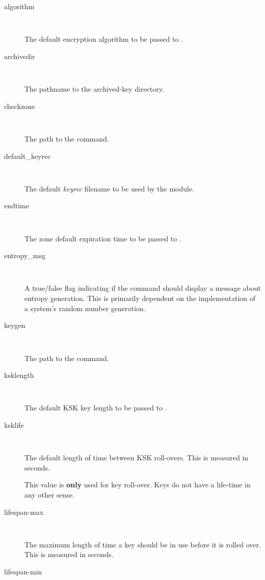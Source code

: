 \begin{description}

\item [algorithm]\verb" "

The default encryption algorithm to be passed to .

\item [archivedir]\verb" "

The pathname to the archived-key directory.

\item [checkzone]\verb" "

The path to the  command.

\item [default\_keyrec]\verb" "

The default {\it keyrec} filename to be used by the  module.

\item [endtime]\verb" "

The zone default expiration time to be passed to .

\item [entropy\_msg]\verb" "

A true/false flag indicating if the  command should display
a message about entropy generation.  This is primarily dependent on the
implementation of a system's random number generation.

\item [keygen]\verb" "

The path to the  command.

\item [ksklength]\verb" "

The default KSK key length to be passed to .

\item [ksklife]\verb" "

The default length of time between KSK roll-overs.  This is measured in
seconds.

This value is {\bf only} used for key roll-over.  Keys do not have a life-time
in any other sense.

\item [lifespan-max]\verb" "

The maximum length of time a key should be in use before it is rolled over.
This is measured in seconds.

\item [lifespan-min]\verb" "


\end{description}
